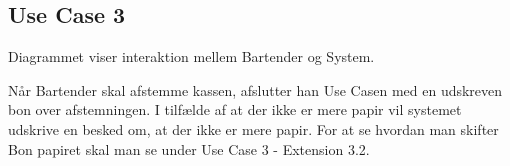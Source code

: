 \subsection{Use Case 3}
Diagrammet viser interaktion mellem Bartender og System.


Når Bartender skal afstemme kassen, afslutter han Use Casen med en udskreven bon over afstemningen. I tilfælde af at der ikke er mere papir vil systemet udskrive en besked om, at der ikke er mere papir.
\newline\newline
For at se hvordan man skifter Bon papiret skal man se under Use Case 3 - Extension 3.2.